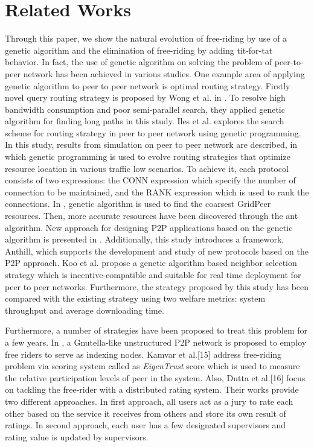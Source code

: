 \documentclass[12pt,journal,draftcls,letterpaper,onecolumn]{IEEEtran}
\begin{document}
\section{Related Works}\label{sec:related}

Through this paper, we show the natural evolution of free-riding by use of a genetic
algorithm and the elimination of free-riding by adding tit-for-tat behavior.
In fact, the use of genetic algorithm on solving the problem of peer-to-peer network has been
achieved in various studies. One example area of applying genetic algorithm to peer to peer
network is optimal routing strategy. Firstly novel query routing strategy is proposed by Wong
et al. in \cite{www05}. To resolve high bandwidth consumption and poor semi-parallel search, they
applied genetic algorithm for finding long paths in this study. Iles et al.\cite{SRDS02} explores the
search scheme for routing strategy in peer to peer network using genetic programming. In this
study, results from simulation on peer to peer network are described, in which genetic
programming is used to evolve routing strategies that optimize resource location in various
traffic low scenarios. To achieve it, each protocol consists of two expressions: the CONN
expression which specify the number of connection to be maintained, and the RANK
expression which is used to rank the connections. In \cite{IIHMSP07}, genetic algorithm is used to find the
coarsest GridPeer resources. Then, more accurate resources have been discovered through the
ant algorithm. New approach for designing P2P applications based on the genetic algorithm is
presented in \cite{ERSADS01}. Additionally, this study introduces a framework, Anthill, which supports the
development and study of new protocols based on the P2P approach. Koo et al.\cite{ns:neighbor} propose a
genetic algorithm based neighbor selection strategy which is incentive-compatible and
suitable for real time deployment for peer to peer networks. Furthermore, the strategy
proposed by this study has been compared with the existing strategy using two welfare
metrics: system throughput and average downloading time.

Furthermore, a number of strategies have been proposed to treat this problem for a few years.
In \cite{EUROPAR07}, a Gnutella-like unstructured P2P network is proposed to employ free riders to serve as
indexing nodes. Kamvar et al.[15] address free-riding problem via scoring system called as
\emph{EigenTrust} score which is used to measure the relative participation levels of peer in the
system. Also, Dutta et al.[16] focus on tackling the free-rider with a distributed rating system.
Their works provide two different approaches. In first approach, all users act as a jury to rate
each other based on the service it receives from others and store its own result of ratings. In
second approach, each user has a few designated supervisors and rating value is updated by
supervisors.
\end{document}
